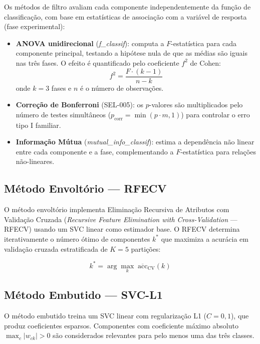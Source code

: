 Os métodos de filtro avaliam cada componente independentemente da função de classificação, com base em estatísticas de associação com a variável de resposta (fase experimental):

\begin{itemize}
    \item \textbf{ANOVA unidirecional} (\textit{f\_classif}): computa a $F$-estatística para cada componente principal, testando a hipótese nula de que as médias são iguais nas três fases. O efeito é quantificado pelo coeficiente $f^2$ de Cohen:
    \begin{equation}
        f^2 = \frac{F \cdot (k-1)}{n - k}
        \label{eq:cohens_f2}
    \end{equation}
    onde $k = 3$ fases e $n$ é o número de observações.
    \item \textbf{Correção de Bonferroni} (SEL-005): os $p$-valores são multiplicados pelo número de testes simultâneos ($p_{\text{corr}} = \min(p \cdot m, 1)$) para controlar o erro tipo I familiar.
    \item \textbf{Informação Mútua} (\textit{mutual\_info\_classif}): estima a dependência não linear entre cada componente e a fase, complementando a $F$-estatística para relações não-lineares.
\end{itemize}

\subsection{Método Envoltório — RFECV}

O método envoltório implementa Eliminação Recursiva de Atributos com Validação Cruzada (\textit{Recursive Feature Elimination with Cross-Validation} --- RFECV) usando um SVC linear como estimador base. O RFECV determina iterativamente o número ótimo de componentes $k^*$ que maximiza a acurácia em validação cruzada estratificada de $K = 5$ partições:

\begin{equation}
    k^* = \arg\max_{k} \; \overline{\text{acc}}_{\text{CV}}(k)
    \label{eq:rfecv}
\end{equation}

\subsection{Método Embutido — SVC-L1}

O método embutido treina um SVC linear com regularização L1 ($C = 0{,}1$), que produz coeficientes esparsos. Componentes com coeficiente máximo absoluto $\max_c |w_{ck}| > 0$ são considerados relevantes para pelo menos uma das três classes.

